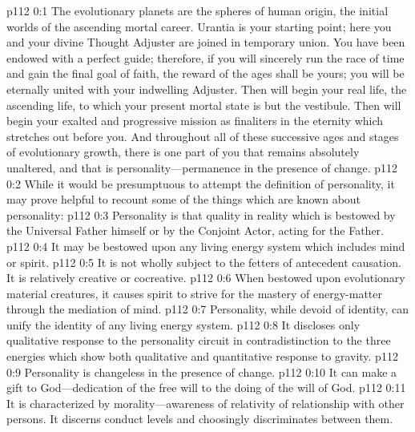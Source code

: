 \author{Solitary Messenger}
\vs p112 0:1 The evolutionary planets are the spheres of human origin, the initial worlds of the ascending mortal career. Urantia is your starting point; here you and your divine Thought Adjuster are joined in temporary union. You have been endowed with a perfect guide; therefore, if you will sincerely run the race of time and gain the final goal of faith, the reward of the ages shall be yours; you will be eternally united with your indwelling Adjuster. Then will begin your real life, the ascending life, to which your present mortal state is but the vestibule. Then will begin your exalted and progressive mission as finaliters in the eternity which stretches out before you. And throughout all of these successive ages and stages of evolutionary growth, there is one part of you that remains absolutely unaltered, and that is personality---permanence in the presence of change.\plusone
\pc \vs p112 0:2 While it would be presumptuous to attempt the definition of personality, it may prove helpful to recount some of the things which are known about personality:\plusone
\pc \vs p112 0:3 \bibnobreakspace Personality is that quality in reality which is bestowed by the Universal Father himself or by the Conjoint Actor, acting for the Father.
\pc \vs p112 0:4 \bibnobreakspace It may be bestowed upon any living energy system which includes mind or spirit.
\pc \vs p112 0:5 \bibnobreakspace It is not wholly subject to the fetters of antecedent causation. It is relatively creative or cocreative.
\pc \vs p112 0:6 \bibnobreakspace When bestowed upon evolutionary material creatures, it causes spirit to strive for the mastery of energy\hyp{}matter through the mediation of mind.
\pc \vs p112 0:7 \bibnobreakspace Personality, while devoid of identity, can unify the identity of any living energy system.
\pc \vs p112 0:8 \bibnobreakspace It discloses only qualitative response to the personality circuit in contradistinction to the three energies which show both qualitative and quantitative response to gravity.\plusone
\pc \vs p112 0:9 \bibnobreakspace Personality is changeless in the presence of change.
\pc \vs p112 0:10 \bibnobreakspace It can make a gift to God---dedication of the free will to the doing of the will of God.
\pc \vs p112 0:11 \bibnobreakspace It is characterized by morality---awareness of relativity of relationship with other persons. It discerns conduct levels and choosingly discriminates between them.
